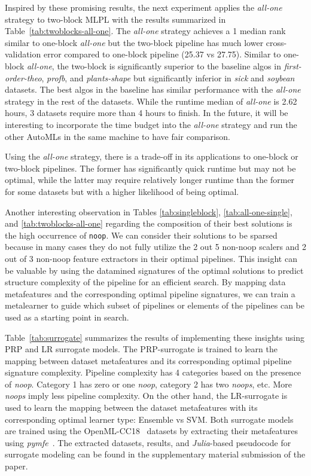 \documentclass{juliacon}
\begin{document}
Inspired by these promising results, the next experiment applies the
\emph{all-one} strategy to two-block MLPL with the results summarized in Table~\ref{tab:twoblocks-all-one}. 
The \emph{all-one} strategy achieves a 1 median rank similar to one-block \emph{all-one} 
but the two-block pipeline has much lower cross-validation error compared to one-block pipeline (25.37 vs 27.75).
Similar to one-block \emph{all-one}, the two-block is significantly superior to the 
baseline algos in \emph{first-order-theo}, \emph{profb}, and \emph{plants-shape}
but significantly inferior in \emph{sick} and \emph{soybean} datasets. The best algos in the baseline
has similar performance with the \emph{all-one} strategy in the rest of the datasets.
While the runtime median of \emph{all-one} is
2.62 hours, 3 datasets require more than 4 hours to finish.  
In the future, it will be interesting to incorporate the time budget into the 
\emph{all-one} strategy and run the other AutoMLs in the same machine to have fair comparison.

\vskip 6pt

Using the \emph{all-one} strategy, there is a trade-off in its applications
to one-block or two-block pipelines. The former has significantly quick runtime
but may not be optimal, while the latter may require relatively longer runtime
than the former for some datasets but with a higher likelihood of being optimal.

\vskip 6pt

Another interesting observation in Tables \ref{tab:singleblock},
\ref{tab:all-one-single}, and \ref{tab:twoblocks-all-one}
regarding the composition of their best solutions
is the high occurrence of \texttt{noop}.
We can consider their solutions to be sparsed because in many cases
they do not fully utilize
the 2 out 5 non-noop scalers and 2 out of 3 non-noop feature extractors in their optimal
pipelines.  This insight can be valuable by using the
datamined signatures of the optimal
solutions to predict structure complexity of the pipeline for an efficient search.
By mapping data metafeatures and the corresponding optimal pipeline signatures,
we can train a metalearner to guide which subset of pipelines or elements
of the pipelines can be used as a starting point in search.

\vskip 6pt

Table~\ref{tab:surrogate} summarizes the results of implementing these
insights using PRP and LR surrogate models.
The PRP-surrogate is trained to learn the mapping between 
dataset metafeatures and its corresponding optimal pipeline 
signature complexity. Pipeline complexity has 4 categories based
on the presence of \emph{noop}. Category 1 has zero or one \emph{noop}, 
category 2 has two \emph{noops}, etc. More \emph{noops} imply 
less pipeline complexity. On the other hand, the LR-surrogate
is used to learn the mapping between the dataset metafeatures 
with its corresponding optimal learner type: Ensemble vs SVM. Both
surrogate models are trained using the OpenML-CC18~\cite{openmlcc18} 
datasets by extracting their metafeatures using \emph{pymfe}~\cite{pymfe2020}. 
The extracted datasets, results, and \emph{Julia}-based pseudocode for 
surrogate modeling can be found in the supplementary material submission of the paper.
\end{document}
